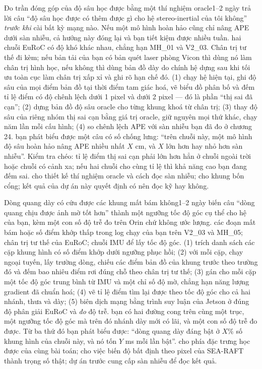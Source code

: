 \documentclass[../../deep_learning.tex]{subfiles}
\begin{document}
\begin{duan}{Đo trần đóng góp của độ sâu học được bằng một thí nghiệm oracle}{1--2 ngày}
\dmt trả lời câu ``độ sâu học được có thêm được gì cho hệ stereo-inertial của tôi không'' \emph{trước khi} cài bất kỳ mạng nào. Nếu một mô hình hoàn hảo cũng chỉ nâng APE dưới sàn nhiễu, cả hướng này đóng lại và bạn tiết kiệm được nhiều tuần.
\ddl hai chuỗi EuRoC có độ khó khác nhau, chẳng hạn MH\_01 và V2\_03. Chân trị tư thế đi kèm; nếu bản tải của bạn có bản quét laser phòng Vicon thì dùng nó làm chân trị hình học, nếu không thì dùng bản đồ dày do chính hệ dựng sau khi tối ưu toàn cục làm chân trị xấp xỉ và ghi rõ hạn chế đó.
\dbc (1) chạy hệ hiện tại, ghi độ sâu của mọi điểm bản đồ tại thời điểm tam giác hoá, vẽ biểu đồ phân bố và đếm tỉ lệ điểm có độ chênh lệch dưới 1 pixel và dưới 2 pixel --- đó là phần ``thị sai đã cạn''; (2) dựng bản đồ độ sâu oracle cho từng khung khoá từ chân trị; (3) thay độ sâu của riêng nhóm thị sai cạn bằng giá trị oracle, giữ nguyên mọi thứ khác, chạy năm lần mỗi cấu hình; (4) so chênh lệch APE với sàn nhiễu bạn đã đo ở chương 24.
\dxk bạn phát biểu được một câu có số chống lưng: ``trên chuỗi này, một mô hình độ sâu hoàn hảo nâng APE nhiều nhất \(X\) cm, và \(X\) lớn hơn hay nhỏ hơn sàn nhiễu''. Kiểm tra chéo: tỉ lệ điểm thị sai cạn phải lớn hơn hẳn ở chuỗi ngoài trời hoặc chuỗi có cảnh xa; nếu hai chuỗi cho cùng tỉ lệ thì khả năng cao bạn đang đếm sai.
\dnv {} cho thiết kế thí nghiệm oracle và cách đọc sàn nhiễu;  cho khung bốn cổng; kết quả của dự án này quyết định có nên đọc kỹ  hay không.
\end{duan}

\begin{duan}{Dòng quang dày có cứu được các khung mất bám không}{1--2 ngày}
\dmt biến câu ``dòng quang chịu được ảnh mờ tốt hơn'' thành một ngưỡng tốc độ góc cụ thể cho hệ của bạn, kèm một con số độ trễ đo trên Orin chứ không ước lượng.
\ddl các đoạn mất bám hoặc số điểm khớp thấp trong log chạy của bạn trên V2\_03 và MH\_05; chân trị tư thế của EuRoC; chuỗi IMU để lấy tốc độ góc.
\dbc (1) trích danh sách các cặp khung hình có số điểm khớp dưới ngưỡng phục hồi; (2) với mỗi cặp, chạy  ngoại tuyến, lấy trường dòng, chiếu các điểm bản đồ của khung trước theo trường đó và đếm bao nhiêu điểm rơi đúng chỗ theo chân trị tư thế; (3) gán cho mỗi cặp một tốc độ góc trung bình từ IMU và một chỉ số độ mờ, chẳng hạn năng lượng gradient đã chuẩn hoá; (4) vẽ tỉ lệ điểm tìm lại được theo tốc độ góc cho cả hai nhánh, thưa và dày; (5) biên dịch mạng bằng trình suy luận của Jetson ở đúng độ phân giải EuRoC và \emph{đo} độ trễ.
\dxk bạn có hai đường cong trên cùng một trục, một ngưỡng tốc độ góc mà trên đó nhánh dày mới có lãi, và một con số độ trễ đo được. Từ ba thứ đó bạn phát biểu được: ``dòng quang dày đáng bật ở \(X\)\% số khung hình của chuỗi này, và nó tốn \(Y\) ms mỗi lần bật''.
\dnv {} cho phía đặc trưng học được của cùng bài toán;  cho việc biến độ bất định theo pixel của SEA-RAFT thành trọng số thật; dự án trước cung cấp sàn nhiễu để đọc kết quả.
\end{duan}
\end{document}
